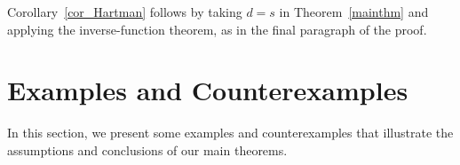 \documentclass{amsart}
\theoremstyle{plain}
\theoremstyle{definition}
\newtheorem{example}[theorem]{Example}
\begin{document}
Corollary~\ref{cor_Hartman} follows by taking $d=s$ in Theorem~\ref{mainthm} and applying the inverse-function theorem, as in the final paragraph of the proof.






\section{Examples and Counterexamples}\label{examples}

In this section, we present some examples and counterexamples that illustrate the assumptions and conclusions of our main theorems.

\end{document}
